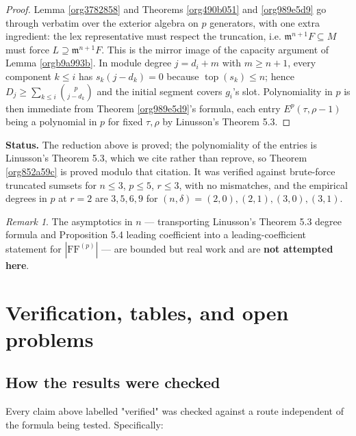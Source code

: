 \documentclass[11pt, a4paper, abstract=yes]{scrartcl}
\theoremstyle{definition}
\theoremstyle{remark}
\newtheorem{remark}[definition]{Remark}
\theoremstyle{plain}
\newcommand{\tp}{\operatorname{top}}
\begin{document}
\begin{proof}
Lemma \ref{org3782858} and Theorems \ref{org490b051} and \ref{org989e5d9} go through verbatim over the exterior
algebra on \(p\) generators, with one extra ingredient: the lex representative must respect the
truncation, i.e. \(\mathfrak m^{n+1}F\subseteq M\) must force \(L\supseteq\mathfrak m^{n+1}F\). This
is the mirror image of the capacity argument of Lemma \ref{orgb9a993b}. In module degree
\(j=d_i+m\) with \(m\ge n+1\), every component \(k\le i\) has \(s_k(j-d_k)=0\) because
\(\tp(s_k)\le n\); hence \(D_j\ge\sum_{k\le i}\binom p{j-d_k}\) and the initial segment covers
\(g_i\)'s slot. Polynomiality in \(p\) is then immediate from Theorem \ref{org989e5d9}'s formula, each
entry \(E^p(\tau,\rho-1)\) being a polynomial in \(p\) for fixed \(\tau,\rho\) by Linusson's
Theorem 5.3.
\end{proof}

\textbf{Status.} The reduction above is proved; the polynomiality of the entries is Linusson's Theorem 5.3,
which we cite rather than reprove, so Theorem \ref{org852a59c} is proved modulo that citation. It was
verified against brute-force truncated sumsets for \(n\le3\), \(p\le5\), \(r\le3\), with no
mismatches, and the empirical degrees in \(p\) at \(r=2\) are \(3,5,6,9\) for
\((n,\delta)=(2,0),(2,1),(3,0),(3,1)\).

\begin{remark}
The asymptotics in \(n\) --- transporting Linusson's Theorem 5.3 degree formula and Proposition 5.4
leading coefficient into a leading-coefficient statement for \(|\mathrm{FF}^{(p)}|\) --- are bounded
but real work and are \textbf{not attempted here}.
\label{org1f988a8}
\end{remark}
\section{Verification, tables, and open problems}
\label{sec:orgeaa5788}
\subsection{How the results were checked}
\label{sec:org52dc8b6}

Every claim above labelled "verified" was checked against a route independent of the formula being
tested. Specifically:
\end{document}
